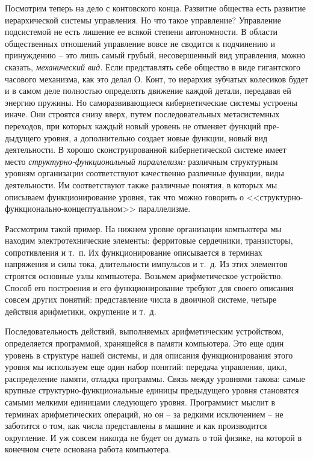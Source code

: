\documentclass{book}
\begin{document}
Посмотрим теперь на дело с контовского конца. Развитие общества есть развитие иерархической системы управления. Но что такое управление? Управление подсистемой не есть лишение ее всякой степени автономности. В области общест­венных отношений управление вовсе не сводится к подчинению и принуждению -- это лишь самый грубый, несовершенный вид управления, можно сказать, \textit{механический вид.}  Если представ­лять себе общество в виде гигантского часового механизма, как это делал О. Конт, то иерархия зубчатых колесиков будет и в самом деле полностью определять движение каждой детали, передавая ей энергию пружины. Но саморазвивающиеся ки­бернетические системы устроены иначе. Они строятся снизу вверх, путем последовательных метасистемных переходов, при которых каждый новый уровень не отменяет функций пре­дыдущего уровня, а дополнительно создает новые функции, новый вид деятельности. В хорошо сконструированной кибер­нетической системе имеет место \textit{структурно-функциональный параллелизм:}  различным 
структурным уровням 
организации соответствуют качественно различные функции, виды деятель­ности. Им соответствуют также различные понятия, в которых мы описываем функционирование уровня, так что можно гово­рить о <<структурно-функционально-концептуальном>> паралле­лизме.

Рассмотрим такой пример. На нижнем уровне организации компьютера мы находим электротехнические элементы: ферритовые сердечники, транзисторы, сопротивления и т.~п. Их функционирование описывается в терминах напряжения и си­лы тока, длительности импульсов и т.~д. Из этих элементов строятся основные узлы компьютера. Возьмем арифметическое устройство. Способ его построения и его функционирова­ние требуют для своего описания совсем других понятий: пред­ставление числа в двоичной системе, четыре действия арифметики, округление и т.~д.

Последовательность действий, выполняемых арифметическим устройством, определяется программой, хранящейся в памяти компьютера. Это еще один уровень в структуре нашей системы, и для описания функционирования этого уровня мы использу­ем еще один набор понятий: передача управления, цикл, распределение памяти, отладка программы. Связь между уровнями такова: самые крупные структурно-функциональные единицы предыдущего уровня становятся самыми мелкими единицами следующего уровня. Программист мыслит в терминах арифметических операций, но он -- за редкими исключением -- не заботится о том, как числа представлены в машине и как производится округление. И уж совсем никогда не будет он думать о той физике, на которой в конечном счете основана работа компьютера.
\end{document}
